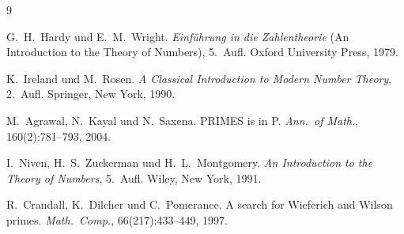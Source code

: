 \documentclass[12pt,a4paper]{amsart}
\theoremstyle{definition}
\begin{document}
\begin{thebibliography}{9}

G.~H.~Hardy und E.~M.~Wright.
\newblock \emph{Einführung in die Zahlentheorie} (An Introduction to the Theory of Numbers), 5.~Aufl.
\newblock Oxford University Press, 1979.

K.~Ireland und M.~Rosen.
\newblock \emph{A Classical Introduction to Modern Number Theory}, 2.~Aufl.
\newblock Springer, New York, 1990.

M.~Agrawal, N.~Kayal und N.~Saxena.
\newblock PRIMES is in P.
\newblock \emph{Ann.\ of Math.}, 160(2):781--793, 2004.

I.~Niven, H.~S.~Zuckerman und H.~L.~Montgomery.
\newblock \emph{An Introduction to the Theory of Numbers}, 5.~Aufl.
\newblock Wiley, New York, 1991.

R.~Crandall, K.~Dilcher und C.~Pomerance.
\newblock A search for Wieferich and Wilson primes.
\newblock \emph{Math.\ Comp.}, 66(217):433--449, 1997.

\end{thebibliography}
\end{document}
